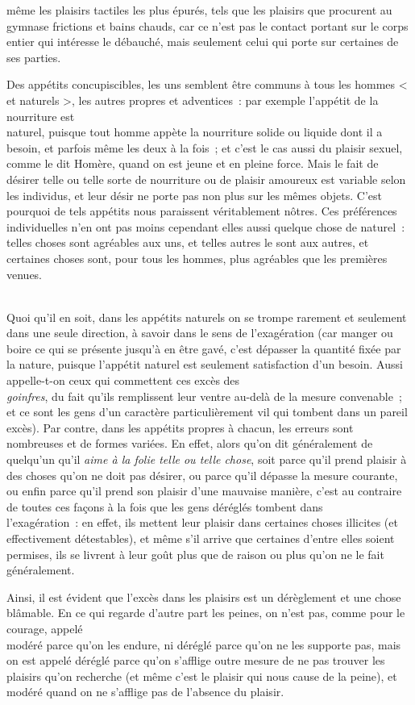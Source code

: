 \documentclass[french,twoside]{book} %
\begin{document}
même les plaisirs tactiles les plus épurés, tels que les plaisirs que procurent au gymnase frictions et bains chauds, car ce n’est pas le contact portant sur le corps entier qui intéresse le débauché, mais seulement celui qui porte sur certaines de ses parties.\par
Des appétits concupiscibles, les uns semblent être communs à tous les hommes < et naturels >, les autres propres et adventices : par exemple l’appétit de la nourriture est \\
naturel, puisque tout homme appète la nourriture solide ou liquide dont il a besoin, et parfois même les deux à la fois ; et c’est le cas aussi du plaisir sexuel, comme le dit Homère, quand on est jeune et en pleine force. Mais le fait de désirer telle ou telle sorte de nourriture ou de plaisir amoureux est variable selon les individus, et leur désir ne porte pas non plus sur les mêmes objets. C’est pourquoi de tels appétits nous paraissent véritablement nôtres. Ces préférences individuelles n’en ont pas moins cependant elles aussi quelque chose de naturel : telles choses sont agréables aux uns, et telles autres le sont aux autres, et certaines choses sont, pour tous les hommes, plus agréables que les premières venues.\par
\\
Quoi qu’il en soit, dans les appétits naturels on se trompe rarement et seulement dans une seule direction, à savoir dans le sens de l’exagération (car manger ou boire ce qui se présente jusqu’à en être gavé, c’est dépasser la quantité fixée par la nature, puisque l’appétit naturel est seulement satisfaction d’un besoin. Aussi appelle-t-on ceux qui commettent ces excès des \\
{\itshape goinfres}, du fait qu’ils remplissent leur ventre au-delà de la mesure convenable ; et ce sont les gens d’un caractère particulièrement vil qui tombent dans un pareil excès). Par contre, dans les appétits propres à chacun, les erreurs sont nombreuses et de formes variées. En effet, alors qu’on dit généralement de quelqu’un qu’il {\itshape aime à la folie telle ou telle chose}, soit parce qu’il prend plaisir à des choses qu’on ne doit pas désirer, ou parce qu’il dépasse la mesure courante, ou enfin parce qu’il prend son plaisir d’une mauvaise manière, c’est au contraire de toutes ces façons à la fois que les gens déréglés tombent dans \\
l’exagération : en effet, ils mettent leur plaisir dans certaines choses illicites (et effectivement détestables), et même s’il arrive que certaines d’entre elles soient permises, ils se livrent à leur goût plus que de raison ou plus qu’on ne le fait généralement.\par
Ainsi, il est évident que l’excès dans les plaisirs est un dérèglement et une chose blâmable. En ce qui regarde d’autre part les peines, on n’est pas, comme pour le courage, appelé \\
modéré parce qu’on les endure, ni déréglé parce qu’on ne les supporte pas, mais on est appelé déréglé parce qu’on s’afflige outre mesure de ne pas trouver les plaisirs qu’on recherche (et même c’est le plaisir qui nous cause de la peine), et modéré quand on ne s’afflige pas de l’absence du plaisir.
\end{document}
